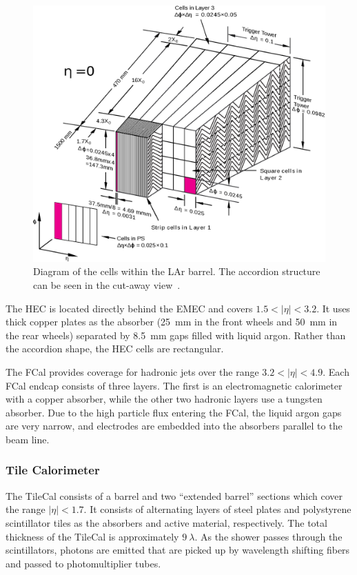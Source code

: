 \begin{figure}[htbp]
  \centering
  \includegraphics[width=.8\textwidth]{figs/detector/lar_accordion}
  \caption[Diagram of the cells within the LAr barrel.  The accordion structure can be seen in the cut-away view.]{Diagram of the cells within the LAr barrel.  The accordion structure can be seen in the cut-away view~\cite{1996.lar-tdr}.}
  \label{fig:lar_accordion}
\end{figure}

The HEC is located directly behind the EMEC and covers $1.5 < |\eta| < 3.2$.
It uses thick copper plates as the absorber (25~mm in the front wheels and 50~mm in the rear wheels) separated by 8.5~mm gaps filled with liquid argon.
Rather than the accordion shape, the HEC cells are rectangular.

The FCal provides coverage for hadronic jets over the range $3.2 < |\eta| < 4.9$.
Each FCal endcap consists of three layers.
The first is an electromagnetic calorimeter with a copper absorber, while the other two hadronic layers use a tungsten absorber.
Due to the high particle flux entering the FCal, the liquid argon gaps are very narrow, and electrodes are embedded into the absorbers parallel to the beam line.

\subsubsection{Tile Calorimeter}
The TileCal consists of a barrel and two ``extended barrel'' sections which cover the range $|\eta| < 1.7$.
It consists of alternating layers of steel plates and polystyrene scintillator tiles as the absorbers and active material, respectively.
The total thickness of the TileCal is approximately $9~\lambda$.
As the shower passes through the scintillators, photons are emitted that are picked up by wavelength shifting fibers and passed to photomultiplier tubes.
